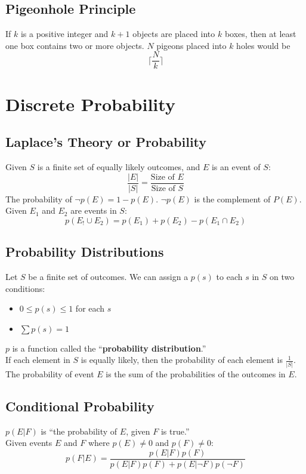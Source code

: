 \documentclass[letter]{article}
\begin{document}
\begin{multicols}{2}
	\subsection{Pigeonhole Principle}
	If $k$ is a positive integer and $k + 1$ objects are placed into $k$ boxes,
	then at least one box contains two or more objects. $N$ pigeons placed into
	$k$ holes would be
	$$\lceil\dfrac{N}{k}\rceil$$

	\section{Discrete Probability}
	
	\subsection{Laplace's Theory or Probability}
	Given $S$ is a finite set of equally likely outcomes, and $E$ is an event of
	$S$:
	$$\frac{|E|}{|S|} = \frac{\text{Size of } E}{\text{Size of } S}$$
	The probability of $\neg p(E) = 1 - p(E)$. $\neg p(E)$ is the complement of
	$P(E)$. \\
	Given $E_1$ and $E_2$ are events in $S$:
	$$p(E_! \cup E_2) = p(E_1) + p(E_2) - p(E_1 \cap E_2)$$
	
	\subsection{Probability Distributions}
	Let $S$ be a finite set of outcomes. We can assign a $p(s)$ to each $s$ in $S$
	on two conditions:
	\begin{itemize}
		\item $0 \leq p(s) \leq 1$ for each $s$
		\item $\sum{p(s)} = 1$
	\end{itemize}
	$p$ is a function called the ``\textbf{probability distribution}.'' \\
	If each element in $S$ is equally likely, then the probability of each element
	is $\frac{1}{|S|}$. \\
	The probability of event $E$ is the sum of the probabilities of the outcomes in
	$E$.
	
	\subsection{Conditional Probability}
	$p(E|F)$ is ``the probability of $E$, given $F$ is true.'' \\
	Given events $E$ and $F$ where $p(E) \neq 0$ and $p(F) \neq 0$:
	$$p(F|E) = \frac{p(E|F)p(F)}{p(E|F)p(F) + p(E|\neg F)p(\neg F)}$$
	

\end{multicols}
\end{document}
